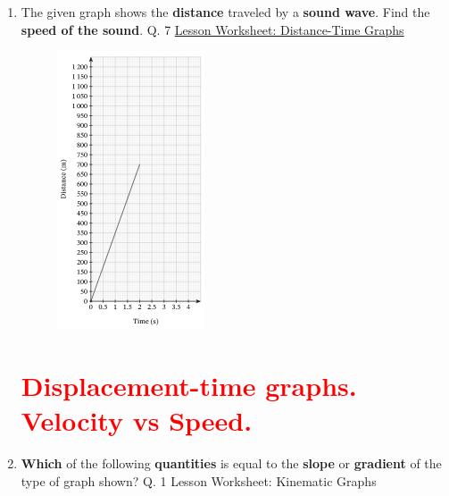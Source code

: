 \documentclass[A4,12pt]{article}
\begin{document}
\begin{enumerate}[label=\bfseries (\arabic*)]
\item The given graph shows the \textbf{distance} traveled by a \textbf{sound wave}. Find the \textbf{speed of the sound}.  \cite{Nagwa} Q. 7 \href{https://www.nagwa.com/en/worksheets/932192593730/}{Lesson Worksheet: Distance-Time Graphs}
%
\begin{figure}[H]
    \centering
    \includegraphics[scale=1]{Nagwa_Q8_kin2.png}
\end{figure}
%











\section*{\textcolor{red}{Displacement-time graphs. Velocity vs Speed.}}












\item \textbf{Which} of the following \textbf{quantities} is equal to the \textbf{slope} or \textbf{gradient} of the type of graph shown? \cite{Nagwa} Q. 1 Lesson Worksheet: Kinematic Graphs


\end{enumerate}
\end{document}
